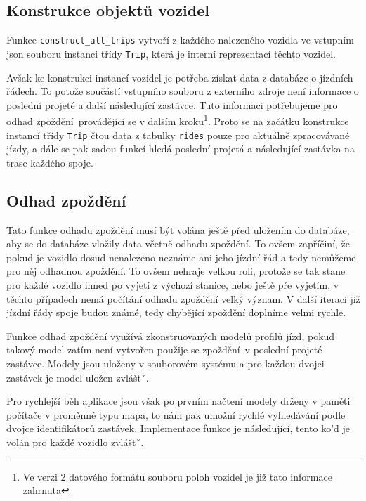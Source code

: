 \subsection{Konstrukce objektů vozidel}

Funkce \verb-construct_all_trips- vytvoří z každého nalezeného vozidla ve vstupním \gls{json} souboru instanci třídy \verb-Trip-, která je interní reprezentací těchto vozidel.

\bigbreak

Avšak ke konstrukci instancí vozidel je potřeba získat data z databáze o jízdních řádech. To potože součástí vstupního souboru z externího zdroje není informace o poslední projeté a další následující zastávce. Tuto informaci potřebujeme pro odhad zpoždění provádějící se v dalším kroku\footnote{Ve verzi 2 datového formátu souboru poloh vozidel je již tato informace zahrnuta}. Proto se na začátku konstrukce instancí třídy \verb-Trip- čtou data z tabulky \verb-rides- pouze pro aktuálně zpracovávané jízdy, a dále se pak sadou funkcí hledá poslední projetá a následující zastávka na trase každého spoje.

\subsection{Odhad zpoždění}

Tato funkce odhadu zpoždění musí být volána ještě před uložením do databáze, aby se do databáze vložily data včetně odhadu zpoždění. To ovšem zapříčiní, že pokud je vozidlo dosud nenalezeno neznáme ani jeho jízdní řád a tedy nemůžeme pro něj odhadnou zpoždění. To ovšem nehraje velkou roli, protože se tak stane pro každé vozidlo ihned po vyjetí z výchozí stanice, nebo ještě pře vyjetím, v těchto případech nemá počítání odhadu zpoždění velký význam. V další iteraci již jízdní řády spoje budou známé, tedy chybějící zpoždění doplníme velmi rychle.

\bigbreak

Funkce odhad zpoždění využívá zkonstruovaných modelů profilů jízd, pokud takový model zatím není vytvořen použije se zpoždění v poslední projeté zastávce. Modely jsou uloženy v souborovém systému a pro každou dvojci zastávek je model uložen zvláštˇ.

\bigbreak

Pro rychlejší běh aplikace jsou však po prvním načtení modely drženy v paměti počítače v proměnné typu mapa, to nám pak umožní rychlé vyhledávání podle dvojce identifikátorů zastávek. Implementace funkce je následující, tento ko'd je volán pro každé vozidlo zvláštˇ.

